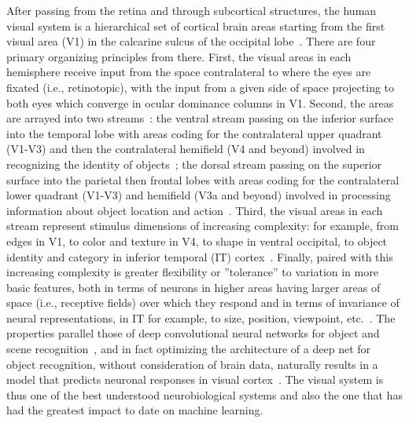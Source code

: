 After passing from the retina and through subcortical structures, the
human visual system is a hierarchical set of cortical brain areas
starting from the first visual area (V1) in the calcarine sulcus of
the occipital lobe~\citep{Felleman:1991}. There are four primary
organizing principles from there. First, the visual areas in each
hemisphere receive input from the space contralateral to where the
eyes are fixated (i.e., retinotopic), with the input from a given side
of space projecting to both eyes which converge in ocular dominance
columns in V1. Second, the areas are arrayed into two
streams~\citep{Mishkin:1983,Goodale:1992}: the ventral stream passing
on the inferior surface into the temporal lobe with areas coding for
the contralateral upper quadrant (V1-V3) and then the contralateral
hemifield (V4 and beyond) involved in recognizing the identity of
objects~\citep{Arcaro:2009}; the dorsal stream passing on the superior
surface into the parietal then frontal lobes with areas coding for the
contralateral lower quadrant (V1-V3) and hemifield (V3a and beyond)
involved in processing information about object location and
action~\citep{Konen:2008}. Third, the visual areas in each stream
represent stimulus dimensions of increasing complexity: for example,
from edges in V1, to color and texture in V4, to shape in ventral
occipital, to object identity and category in inferior temporal (IT)
cortex~\citep{Grill-Spector:2003,Rousselet:2004}. Finally, paired with
this increasing complexity is greater flexibility or ''tolerance'' to
variation in more basic features, both in terms of neurons in higher
areas having larger areas of space (i.e., receptive fields) over which
they respond and in terms of invariance of neural representations, in
IT for example, to size, position, viewpoint, etc.~\citep{Rust:2010}.
The properties parallel those of deep convolutional neural networks
for object and scene recognition~\citep{Kriegeskorte:2015}, and in
fact optimizing the architecture of a deep net for object
recognition, without consideration of brain data, naturally
results in a model that predicts neuronal responses in visual
cortex~\citep{Yamins:2016}. The visual system is thus one of the best
understood neurobiological systems and also the one that has had the
greatest impact to date on machine learning.


